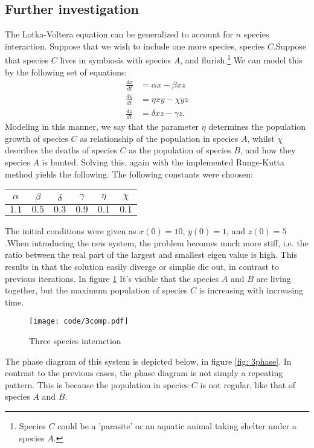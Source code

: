\documentclass[a4paper]{article}
\begin{document}
\subsection{Further investigation}
The Lotka-Voltera equation can be generalized to account for $n$ species interaction. Suppose that we wish to include one more species, species $C$.Suppose that species $C$ lives in symbiosis with species $A$, and flurish.\footnote{Species $C$ could be a 'parasite' or an aquatic animal taking shelter under a species $A$.} We can model this by the following set of equations:
\begin{align}
    \frac{dx}{dt} &= \alpha x - \beta xz \nonumber\\
    \frac{dy}{dt} &= \eta x y - \chi y z \nonumber\\
    \frac{dz}{dt} &= \delta xz - \gamma z.\label{eq: mod-eq}
\end{align}
Modeling in this manner, we say that the parameter $\eta$ determines the population growth of species $C$ as relationship of the population in species $A$, whilst $\chi$ describes the deaths of species $C$ as the population of species $B$, and how they species $A$ is hunted. Solving this, again with the implemented Runge-Kutta method yields the following. The following constants were choosen:
\begin{table}[H]
    \centering
    \begin{tabular}{|c|c|c|c|c|c|}\hline
    $\alpha$ & $\beta$ & $\delta$ & $\gamma$ & $\eta$ & $\chi$\\\hline
    $1.1$ & $0.5$ & $0.3$ & $0.9$ & $0.1$ & $0.1$\\\hline
    \end{tabular}
\end{table}\noindent
The initial conditions were given as $x(0) = 10$, $y(0) = 1$, and $z(0) = 5$.When introducing the new system, the problem becomes much more stiff, i.e. the ratio between the real part of the largest and smallest eigen value is high. This results in that the solution easily diverge or simplie die out, in contrast to previous iterations. In figure \ref{fig: 3 species interaction pop} It's visible that the species $A$ and $B$ are living together, but the maximum population of species $C$ is increasing with increasing time.
\begin{figure}[H]
    \centering
    \texttt{[image: code/3comp.pdf]}
    \caption{Three species interaction}
    \label{fig: 3 species interaction pop}
\end{figure}\noindent
The phase diagram of this system is depicted below, in figure \ref{fig: 3phase}. In contrast to the previous cases, the phase diagram is not simply a repeating pattern. This is because the population in species $C$ is not regular, like that of species $A$ and $B$.
\end{document}
